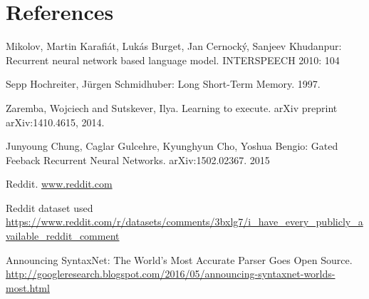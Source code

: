 \documentclass{article} %
\begin{document}
\clearpage
\section{References}
Mikolov, Martin Karafiát, Lukás Burget, Jan Cernocký, Sanjeev Khudanpur:
Recurrent neural network based language model. INTERSPEECH 2010: 104

Sepp Hochreiter, J{\"u}rgen Schmidhuber: Long Short-Term Memory. 1997.

Zaremba, Wojciech and Sutskever, Ilya. Learning to execute.
arXiv preprint arXiv:1410.4615, 2014.

Junyoung Chung, Caglar Gulcehre, Kyunghyun Cho, Yoshua Bengio: Gated Feeback
Recurrent Neural Networks. arXiv:1502.02367. 2015

Reddit. \url{www.reddit.com}

Reddit dataset used \url{https://www.reddit.com/r/datasets/comments/3bxlg7/i_have_every_publicly_available_reddit_comment}

Announcing SyntaxNet: The World’s Most Accurate Parser Goes Open Source. \url{http://googleresearch.blogspot.com/2016/05/announcing-syntaxnet-worlds-most.html}
\end{document}

